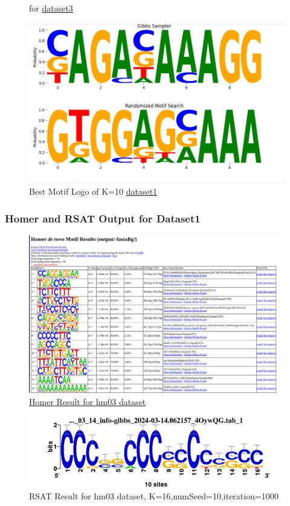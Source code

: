 \documentclass[11pt]{article}
\begin{document}
\begin{figure}[htbp]
\begin{minipage}[t]{0.5\columnwidth}
                    \caption{for \href{https://github.com/Superb-Man/Bio-Info/blob/master/data/yst08r.txt}{dataset3}}
                    \label{fig:Fig-8}
                \end{minipage}
                \begin{minipage}[t]{0.5\columnwidth}
                    \centering
                    \includegraphics[width=0.5\columnwidth]{images/2-10.png} 
                    \caption{Best Motif Logo of K=10 \href{https://github.com/Superb-Man/Bio-Info/blob/master/data/hm03.txt}{dataset1}}
                    \label{fig:Fig-9}
                \end{minipage}
            \end{figure}

        \subsubsection{Homer and RSAT Output for Dataset1}
            \begin{figure}[hbt!]
                \centering
                \includegraphics[width=0.5\columnwidth]{images/Homer.png} 
                \caption{\href{https://github.com/Superb-Man/Bio-Info/blob/master/output/-fastaBg/homerResults.html}{Homer Result for hm03 dataset}}
                \label{fig:Fig-10}
            \end{figure}
             \begin{figure}[hbt!]
                \centering
                \includegraphics[width=0.5\columnwidth]{images/RSAT.png} 
                \caption{RSAT Result for hm03 dataset, K=16,numSeed=10,iteration=1000}
                \label{fig:Fig-11}
            \end{figure}
        
\end{document}
